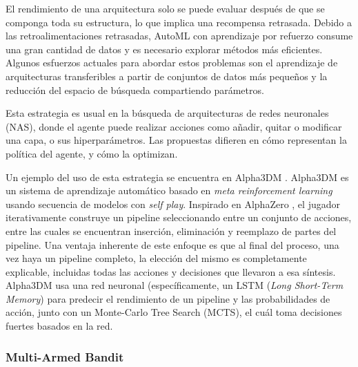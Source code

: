 El rendimiento de una arquitectura solo se puede evaluar después de que se componga toda su estructura, lo que implica una recompensa retrasada. Debido a las retroalimentaciones retrasadas, AutoML con aprendizaje por refuerzo consume una gran cantidad de datos y es necesario explorar métodos más eficientes. Algunos esfuerzos actuales para abordar estos problemas son el aprendizaje de arquitecturas transferibles a partir de conjuntos de datos más pequeños y la reducción del espacio de búsqueda compartiendo parámetros.

Esta estrategia es usual en la búsqueda de arquitecturas de redes neuronales (NAS), donde el agente puede realizar acciones como añadir, quitar o modificar una capa, o sus hiperparámetros. Las propuestas difieren en cómo representan la política del agente, y cómo la optimizan.

Un ejemplo del uso de esta estrategia se encuentra en Alpha3DM \cite{drori2018alphad3m}. Alpha3DM es un sistema de aprendizaje automático basado en \textit{meta reinforcement learning} usando secuencia de modelos con \textit{self play}. Inspirado en AlphaZero \cite{alphazero}, el jugador iterativamente construye un pipeline seleccionando entre un conjunto de acciones, entre las cuales se encuentran inserción, eliminación y reemplazo de partes del pipeline. Una ventaja inherente de este enfoque es que al final del proceso, una vez haya un pipeline completo, la elección del mismo es completamente explicable, incluidas todas las acciones y decisiones que llevaron a esa síntesis. Alpha3DM usa una red neuronal (específicamente, un LSTM (\textit{Long Short-Term Memory})  para predecir el rendimiento de un pipeline y las probabilidades de acción, junto con un Monte-Carlo Tree Search (MCTS), el cuál toma decisiones fuertes basados en la red.

\subsubsection{Multi-Armed Bandit}




